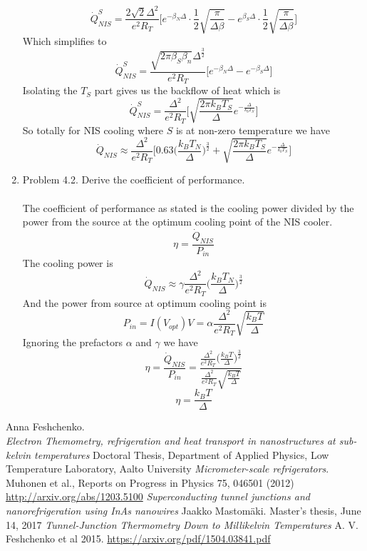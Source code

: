 \documentclass[12pt]{article}
\begin{document}
\begin{enumerate}
    $$ \dot{Q}^S_{NIS} = \frac{2 \sqrt{2} \Delta^2}{e^2 R_T} \Big[e^{-\beta_N \Delta}\cdot \frac{1}{2} \sqrt{\frac{\pi}{\Delta \beta}} - e^{\beta_S \Delta} \cdot \frac{1}{2} \sqrt{\frac{\pi}{\Delta \beta}} \Big] $$
    Which simplifies to 
    $$ \dot{Q}^S_{NIS} = \frac{\sqrt{2 \pi \beta_S \beta_n} \Delta^{\frac{3}{2}}}{e^2 R_T} \Big[ e^{-\beta_N \Delta} - e^{-\beta_S \Delta}\Big] $$
    Isolating the $T_S$ part gives us the backflow of heat which is 
    $$ \dot{Q}^S_{NIS} = \frac{\Delta^2}{e^2 R_T} \Big[ \sqrt{\frac{2 \pi k_B T_S}{\Delta}} e^{-\frac{\Delta}{k_b T_S}}\Big]$$
    So totally for NIS cooling where $S$ is at non-zero temperature we have 
    $$ \dot{Q}_{NIS} \approx \frac{\Delta^2}{e^2 R_T} \Big[ 0.63\Big(\frac{k_B T_N}{\Delta}\Big)^{\frac{3}{2}} + \sqrt{\frac{2 \pi k_B T_S}{\Delta}} e^{-\frac{\Delta}{k_b T_S}}\Big] $$

    \item Problem 4.2. Derive the coefficient of performance. \\
    \\
    The coefficient of performance as stated is the cooling power divided by the power from the source at the optimum cooling point of the NIS cooler. 
    $$ \eta = \frac{\dot{Q}_{NIS}}{P_{in}} $$
    The cooling power is 
    $$ \dot{Q}_{NIS} \approx \gamma \frac{\Delta^2}{e^2 R_T}\Big(\frac{k_B T_N}{\Delta}\Big)^{\frac{3}{2}} $$
    And the power from source at optimum cooling point is 
    $$ P_{in} = I(V_{opt}) V = \alpha \frac{\Delta^2}{e^2 R_T} \sqrt{\frac{k_B T}{\Delta}} $$
    Ignoring the prefactors $\alpha$ and $\gamma$ we have 
    $$ \eta = \frac{\dot{Q}_{NIS}}{P_{in}} = \frac{\frac{\Delta^2}{e^2 R_T}\Big(\frac{k_B T}{\Delta}\Big)^{\frac{3}{2}}}{\frac{\Delta^2}{e^2 R_T} \sqrt{\frac{k_B T}{\Delta}}} $$
    $$ \eta = \frac{k_B T}{\Delta} $$


\end{enumerate}
\begin{thebibliography}{9}
    Anna Feshchenko. \\
    \textit{Electron Themometry, refrigeration and heat transport in nanostructures at sub-kelvin temperatures}
    Doctoral Thesis, Department of Applied Physics, Low Temperature Laboratory, Aalto University
    \textit{Micrometer-scale refrigerators}. Muhonen et al.,
    Reports on Progress in Physics 75, 046501 (2012)
    \url{ http://arxiv.org/abs/1203.5100}
    \textit{Superconducting tunnel junctions
    and nanorefrigeration using InAs
    nanowires} Jaakko Mastomäki. Master’s thesis, June 14, 2017
    \textit{Tunnel-Junction Thermometry Down to Millikelvin Temperatures} A. V. Feshchenko et al 2015.
    \url{https://arxiv.org/pdf/1504.03841.pdf}


\end{thebibliography}
\end{document}
